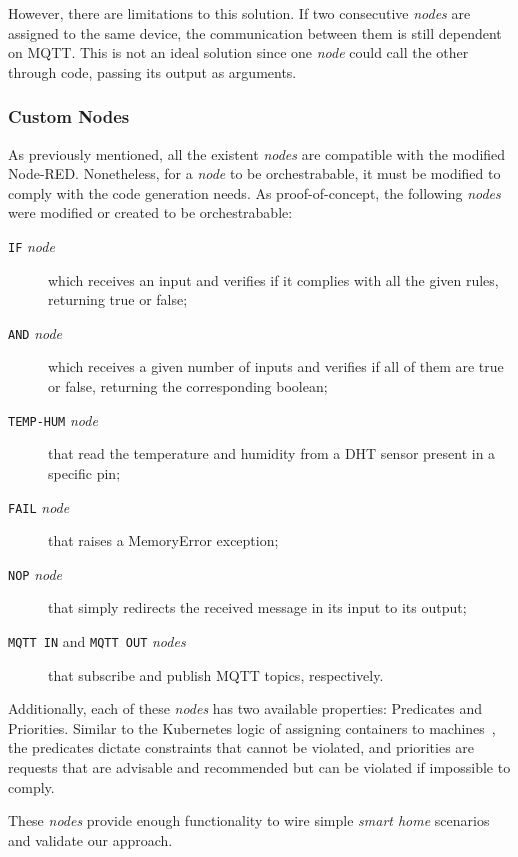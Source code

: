 However, there are limitations to this solution. If two consecutive \textit{nodes} are assigned to the same device, the communication between them is still dependent on MQTT. This is not an ideal solution since one \textit{node} could call the other through code, passing its output as arguments.

\subsubsection{Custom Nodes}\label{sec:custom_nodes}

As previously mentioned, all the existent \textit{nodes} are compatible with the modified Node-RED. Nonetheless, for a \textit{node} to be orchestrabable, it must be modified to comply with the code generation needs. As proof-of-concept, the following \textit{nodes} were modified or created to be orchestrabable:
\begin{description}
    \item[\texttt{IF} \textit{node}] which receives an input and verifies if it complies with all the given rules, returning true or false;
    \item[\texttt{AND} \textit{node}] which receives a given number of inputs and verifies if all of them are true or false, returning the corresponding boolean;
    \item[\texttt{TEMP-HUM} \textit{node}] that read the temperature and humidity from a DHT sensor present in a specific pin;
    \item[\texttt{FAIL} \textit{node}] that raises a MemoryError exception;
    \item[\texttt{NOP} \textit{node}] that simply redirects the received message in its input to its output;
    \item[\texttt{MQTT IN} and \texttt{MQTT OUT} \textit{nodes}] that subscribe and publish MQTT topics, respectively.
\end{description}

Additionally, each of these \textit{nodes} has two available properties: Predicates and Priorities. Similar to the Kubernetes logic of assigning containers to machines~\cite{burns2018managing}, the predicates dictate constraints that cannot be violated, and priorities are requests that are advisable and recommended but can be violated if impossible to comply. 

These \textit{nodes} provide enough functionality to wire simple \textit{smart home} scenarios and validate our approach. 

